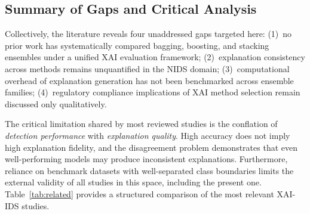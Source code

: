 \documentclass[conference]{IEEEtran}
\begin{document}
\subsection{Summary of Gaps and Critical Analysis}

Collectively, the literature reveals four unaddressed gaps targeted here: (1)~no prior work has systematically compared bagging, boosting, and stacking ensembles under a unified XAI evaluation framework; (2)~explanation consistency across methods remains unquantified in the NIDS domain; (3)~computational overhead of explanation generation has not been benchmarked across ensemble families; (4)~regulatory compliance implications of XAI method selection remain discussed only qualitatively.

The critical limitation shared by most reviewed studies is the conflation of \textit{detection performance} with \textit{explanation quality}. High accuracy does not imply high explanation fidelity, and the disagreement problem \cite{krishna2022} demonstrates that even well-performing models may produce inconsistent explanations. Furthermore, reliance on benchmark datasets with well-separated class boundaries limits the external validity of all studies in this space, including the present one. Table~\ref{tab:related} provides a structured comparison of the most relevant XAI-IDS studies.
\end{document}
